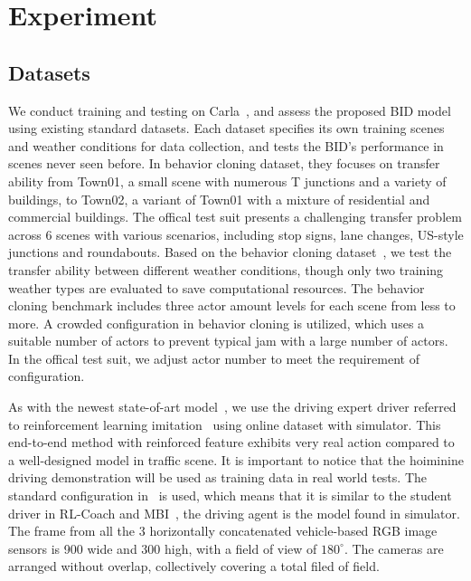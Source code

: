 \section{Experiment}
%	

\subsection{Datasets} \label{sec:Dataset}

\hspace{1pc}We conduct training and testing on Carla~\cite{Dosovitskiy:2017},
and assess the proposed BID model using existing standard datasets\cite{codevilla2019exploring}. 
Each dataset specifies its own training scenes and weather conditions for data collection, 
and tests the BID's performance in scenes never seen before. 
In behavior cloning dataset\cite{codevilla2019exploring}, they focuses on transfer ability from Town01, a small scene with numerous T junctions and a variety of buildings, to Town02, a variant of Town01 with a mixture of residential and commercial buildings.
The offical test suit presents a challenging transfer problem across 6 scenes with various scenarios, including stop signs, lane changes, US-style junctions and roundabouts.
Based on the behavior cloning dataset~\cite{codevilla2019exploring}, we test the transfer ability between different weather conditions, though only two training weather types are evaluated to save computational resources. 
The behavior cloning benchmark includes three actor amount levels for each scene from less to more. 
A crowded configuration in behavior cloning is utilized, which uses a suitable number of actors to prevent typical jam with a large number of actors. 
In the offical test suit, we adjust actor number to meet the requirement of configuration. 


As with the newest state-of-art model~\cite{Hu:2022}, we use the driving expert driver referred to reinforcement learning imitation~\cite{Zhang:2021} using online dataset with simulator.
This end-to-end method with reinforced feature exhibits very real action compared to a well-designed model in traffic scene. 
It is important to notice that the hoiminine driving demonstration will be used as training data in real world tests.
The standard configuration in~\cite{Zhang:2021} is used, which means that it is similar to the student driver in RL-Coach\cite{Zhang:2021} and MBI~\cite{Hu:2022}, the driving agent is the model found in simulator.
The frame from all the 3 horizontally concatenated vehicle-based RGB image sensors is 900 wide and 300 high, with a field of view of $180^{\circ}$.
The cameras are arranged without overlap, collectively covering a total filed of field.


